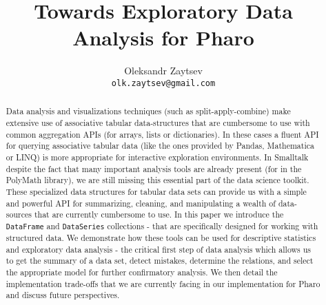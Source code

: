 \documentclass{article}
\title{Towards Exploratory Data Analysis for Pharo}
\author{
  Oleksandr Zaytsev\\
    \texttt{olk.zaytsev@gmail.com}}
\date{}
\begin{document}
\maketitle


\begin{abstract}

\noindent Data analysis and visualizations techniques (such as split-apply-combine) make extensive use of associative tabular data-structures that are cumbersome to use with common aggregation APIs (for arrays, lists or dictionaries). In these cases a fluent API for querying associative tabular data (like the ones provided by Pandas, Mathematica or LINQ) is more appropriate for interactive exploration environments. In Smalltalk despite the fact that many important analysis tools are already present (for \eg in the PolyMath library), we are still missing this essential part of the data science toolkit. These specialized data structures for tabular data sets can provide us with a simple and powerful API for summarizing, cleaning, and manipulating a wealth of data-sources that are currently cumbersome to use. In this paper we introduce the \texttt{DataFrame} and \texttt{DataSeries} collections - that are specifically designed for working with structured data. We demonstrate how these tools can be used for descriptive statistics and exploratory data analysis - the critical first step of data analysis which allows us to get the summary of a data set, detect mistakes, determine the relations, and select the appropriate model for further confirmatory analysis. We then detail the implementation trade-offs that we are currently facing in our implementation for Pharo and discuss future perspectives.
\end{abstract}
\end{document}
